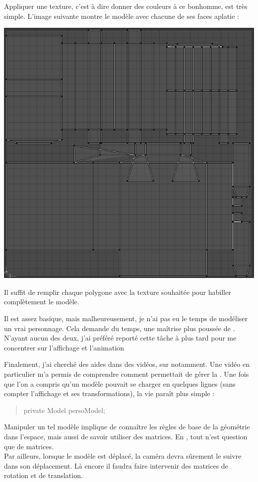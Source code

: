 \documentclass{article}
\begin{document}
Appliquer une texture, c'est à dire donner des couleurs à ce bonhomme, est très simple. L'image suivante montre le modèle  avec chacune de ses faces aplatie : 
\begin{center}
\includegraphics[scale=0.5]{UVmapping}
\end{center}
Il suffit de remplir chaque polygone avec la texture souhaitée pour habiller complètement le modèle.

Il est assez basique, mais malheureusement, je n'ai pas eu le temps de modéliser un vrai personnage. Cela demande du temps, une maîtrise plus poussée de . N'ayant aucun des deux, j'ai préféré reporté cette tâche à plus tard pour me concentrer sur l'affichage et l'animation 

Finalement, j'ai cherché des aides dans des vidéos, sur  notamment. Une vidéo en particulier m'a permis de comprendre comment  permettait de gérer la . Une fois que l'on a compris qu'un modèle  pouvait se charger en quelques lignes (sans compter l'affichage et ses transformations), la vie paraît plus simple : \begin{quote}
private Model persoModel;
\end{quote}

Manipuler un tel modèle implique de connaître les règles de base de la géométrie dans l'espace, mais aussi de savoir utiliser des matrices. En , tout n'est question que de matrices. \\
Par ailleurs, lorsque le modèle est déplacé, la caméra devra sûrement le suivre dans son déplacement. Là encore il faudra faire intervenir des matrices de rotation et de translation.
\newline
\end{document}
